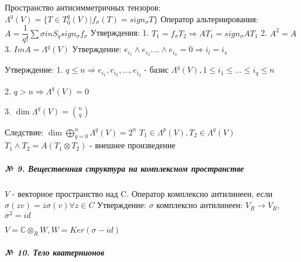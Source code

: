 \documentclass{article}
\begin{document}
\begin{flushleft}

Пространство антисимметричных тензоров: $\Lambda^q(V) = \{T \in T_0^q(V) | f_\sigma(T) = sign_\sigma T\}$
Оператор альтернирования:
$A = \dfrac{1}{q!} \sum\limits{\sigma in S_q}{sign_\sigma f_\sigma}$
Утверждения:
1. $T_1 = f_\sigma T_2 \Rightarrow AT_1 = sign_\sigma AT_1$
2. $A^2 = A$
3. $ImA = \Lambda^q(V)$
Утверждение:
$e_{i_1} \wedge e_{i_2} .... \wedge e_{i_n} = 0 \Rightarrow i_l = i_s$

Утверждение:
1. $q \leq n \Rightarrow e_{i_1}, e_{i_2}, ..., e_{i_q}$ - базис $\Lambda^q(V), 1 \leq i_1 \leq ... \leq i_q \leq n$

2. $q > n \Rightarrow \Lambda^q(V) = 0$

3. $\dim{\Lambda^q(V)} = {n \choose q}$

Следствие: 
$\dim{\bigoplus\limits_{q = 0}^n{\Lambda^q(V)}} = 2^n$
$T_1 \in \Lambda^p(V), T_2 \in \Lambda^q(V)$
$T_1 \wedge T_2 = A(T_1 \otimes T_2)$ - внешнее произведение

\end{flushleft}


\subparagraph{\tiny № 9. Вещественная структура на комплексном пространстве}

\begin{flushleft}

$V$ - векторное пространство над C.
Оператор комплексно антилинеен, если $\sigma (zv) = \overline{z} \sigma(v) \forall z \in C$
Утверждение:
$\sigma$ комплексно антилинеен: $V_R \rightarrow V_R$, $\sigma^2 = id$

$V = \mathbb{C} \otimes_R W, W = Ker(\sigma - id)$

\end{flushleft}

\subparagraph{\tiny № 10. Тело кватернионов}
\end{document}
